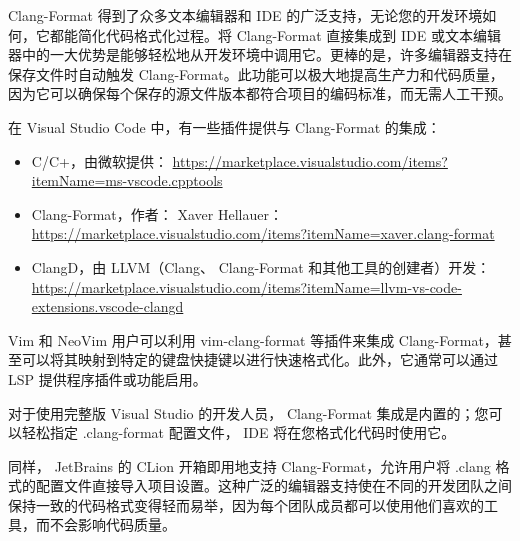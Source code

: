 Clang-Format 得到了众多文本编辑器和 IDE 的广泛支持，无论您的开发环境如何，它都能简化代码格式化过程。将 Clang-Format 直接集成到 IDE 或文本编辑器中的一大优势是能够轻松地从开发环境中调用它。更棒的是，许多编辑器支持在保存文件时自动触发 Clang-Format。此功能可以极大地提高生产力和代码质量，因为它可以确保每个保存的源文件版本都符合项目的编码标准，而无需人工干预。

在 Visual Studio Code 中，有一些插件提供与 Clang-Format 的集成：

\begin{itemize}
\item
C/C+，由微软提供： \url{https://marketplace.visualstudio.com/items?itemName=ms-vscode.cpptools}

\item
Clang-Format，作者： Xaver Hellauer： \url{https://marketplace.visualstudio.com/items?itemName=xaver.clang-format}

\item
ClangD，由 LLVM（Clang、 Clang-Format 和其他工具的创建者）开发： \url{https://marketplace.visualstudio.com/items?itemName=llvm-vs-code-extensions.vscode-clangd}
\end{itemize}

Vim 和 NeoVim 用户可以利用 vim-clang-format 等插件来集成 Clang-Format，甚至可以将其映射到特定的键盘快捷键以进行快速格式化。此外，它通常可以通过 LSP 提供程序插件或功能启用。

对于使用完整版 Visual Studio 的开发人员， Clang-Format 集成是内置的；您可以轻松指定 .clang-format 配置文件， IDE 将在您格式化代码时使用它。

同样， JetBrains 的 CLion 开箱即用地支持 Clang-Format，允许用户将 .clang 格式的配置文件直接导入项目设置。这种广泛的编辑器支持使在不同的开发团队之间保持一致的代码格式变得轻而易举，因为每个团队成员都可以使用他们喜欢的工具，而不会影响代码质量。
















